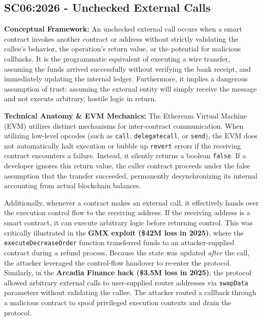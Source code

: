 \subsection{SC06:2026 - Unchecked External Calls}
\textbf{Conceptual Framework:} An unchecked external call occurs when a smart contract invokes another contract or address without strictly validating the callee's behavior, the operation's return value, or the potential for malicious callbacks. It is the programmatic equivalent of executing a wire transfer, assuming the funds arrived successfully without verifying the bank receipt, and immediately updating the internal ledger. Furthermore, it implies a dangerous assumption of trust: assuming the external entity will simply receive the message and not execute arbitrary, hostile logic in return.

\textbf{Technical Anatomy \& EVM Mechanics:} The Ethereum Virtual Machine (EVM) utilizes distinct mechanisms for inter-contract communication. When utilizing low-level opcodes (such as \texttt{call}, \texttt{delegatecall}, or \texttt{send}), the EVM does not automatically halt execution or bubble up \texttt{revert} errors if the receiving contract encounters a failure. Instead, it silently returns a boolean \texttt{false}. If a developer ignores this return value, the caller contract proceeds under the false assumption that the transfer succeeded, permanently desynchronizing its internal accounting from actual blockchain balances.

Additionally, whenever a contract makes an external call, it effectively hands over the execution control flow to the receiving address. If the receiving address is a smart contract, it can execute arbitrary logic before returning control. This was critically illustrated in the \textbf{GMX exploit (\$42M loss in 2025)}, where the \texttt{executeDecreaseOrder} function transferred funds to an attacker-supplied contract during a refund process. Because the state was updated \textit{after} the call, the attacker leveraged the control-flow handover to re-enter the protocol. Similarly, in the \textbf{Arcadia Finance hack (\$3.5M loss in 2025)}, the protocol allowed arbitrary external calls to user-supplied router addresses via \texttt{swapData} parameters without validating the callee. The attacker routed a callback through a malicious contract to spoof privileged execution contexts and drain the protocol.

